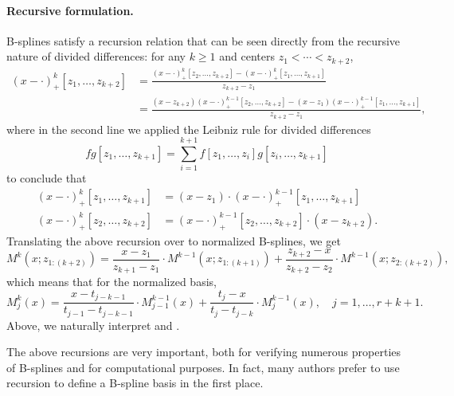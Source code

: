 \documentclass{article}
\begin{document}
\paragraph{Recursive formulation.} 

B-splines satisfy a recursion relation that can be seen directly from the
recursive nature of divided differences: for any $k \geq 1$ and centers $z_1 <
\cdots < z_{k+2}$,  
\begin{align*}
(x - \cdot)^k_+ [z_1,\dots,z_{k+2}]
&= \frac{(x - \cdot)^k_+[z_2,\dots,z_{k+2}] - 
(x -\cdot)^k_+[z_1,\dots,z_{k+1}]}{z_{k+2} - z_1} \\
&= \frac{(x-z_{k+2})(x - \cdot)^{k-1}_+[z_2,\dots,z_{k+2}] 
- (x-z_1) (x - \cdot)^{k-1}_+[z_1,\dots,z_{k+1}] }{z_{k+2} - z_1},  
\end{align*} 
where in the second line we applied the Leibniz rule for divided differences 
\[
fg [z_1,\dots,z_{k+1}] = \sum_{i=1}^{k+1} f[z_1,\dots,z_i] g[z_i,\dots,z_{k+1}] 
\]
to conclude that
\begin{align*}
(x - \cdot)^k_+ [z_1,\dots,z_{k+1}] &= (x-z_1) \cdot 
(x - \cdot)^{k-1}_+ [z_1,\dots,z_{k+1}] \\
(x - \cdot)^k_+ [z_2,\dots,z_{k+2}] &= (x - \cdot)^{k-1}_+ 
  [z_2,\dots,z_{k+2}] \cdot (x-z_{k+2}). 
\end{align*}
Translating the above recursion over to normalized B-splines, we get 
\[
M^k(x; z_{1:(k+2)}) = \frac{x-z_1}{z_{k+1}-z_1} \cdot 
M^{k-1}(x; z_{1:(k+1)}) + \frac{z_{k+2}-x}{z_{k+2}-z_2} \cdot 
M^{k-1}(x; z_{2:(k+2)}),  
\]
which means that for the normalized basis, 
\[
M^k_j(x) = \frac{x-t_{j-k-1}}{t_{j-1}-t_{j-k-1}} \cdot
M^{k-1}_{j-1}(x) + \frac{t_j-x}{t_j-t_{j-k}} \cdot M^{k-1}_j(x), 
\quad j=1,\dots,r+k+1.  
\]
Above, we naturally interpret  and . 

The above recursions are very important, both for verifying numerous properties
of B-splines and for computational purposes. In fact, many authors prefer to
use recursion to define a B-spline basis in the first place.
\end{document}
